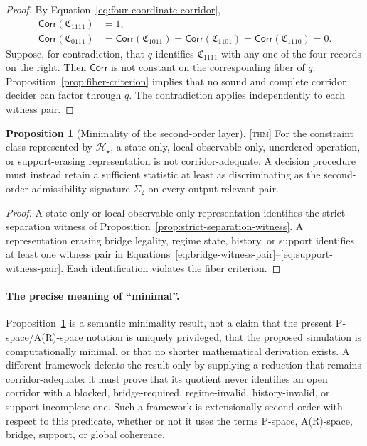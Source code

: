 \documentclass[11pt]{article}
\newcommand{\Thm}{\textsc{[thm]}}
\theoremstyle{definition}
\newtheorem{sproposition}{Proposition}
\begin{document}
\begin{proof}
By Equation~\eqref{eq:four-coordinate-corridor},
\begin{align}
\mathsf{Corr}(\mathfrak C_{1111})&=1,\\
\mathsf{Corr}(\mathfrak C_{0111})
&=\mathsf{Corr}(\mathfrak C_{1011})
=\mathsf{Corr}(\mathfrak C_{1101})
=\mathsf{Corr}(\mathfrak C_{1110})=0.
\end{align}
Suppose, for contradiction, that $q$ identifies $\mathfrak C_{1111}$ with any one
of the four records on the right. Then $\mathsf{Corr}$ is not constant on the
corresponding fiber of $q$. Proposition~\ref{prop:fiber-criterion} implies that no
sound and complete corridor decider can factor through $q$. The contradiction
applies independently to each witness pair.
\end{proof}

\begin{sproposition}[Minimality of the second-order layer]
\label{prop:second-order-minimality}
\Thm{} For the constraint class represented by $\mathcal H_\star$, a state-only,
local-observable-only, unordered-operation, or support-erasing representation is
not corridor-adequate. A decision procedure must instead retain a sufficient
statistic at least as discriminating as the second-order admissibility signature
$\Sigma_2$ on every output-relevant pair.
\end{sproposition}

\begin{proof}
A state-only or local-observable-only representation identifies the strict
separation witness of Proposition~\ref{prop:strict-separation-witness}. A
representation erasing bridge legality, regime state, history, or support
identifies at least one witness pair in
Equations~\eqref{eq:bridge-witness-pair}--\eqref{eq:support-witness-pair}. Each
identification violates the fiber criterion.
\end{proof}

\paragraph{The precise meaning of ``minimal''.}\label{rem:minimality-scope}
Proposition~\ref{prop:second-order-minimality} is a semantic minimality result,
not a claim that the present P-space/A(R)-space notation is uniquely privileged,
that the proposed simulation is computationally minimal, or that no shorter
mathematical derivation exists. A different framework defeats the result only by
supplying a reduction that remains corridor-adequate: it must prove that its
quotient never identifies an open corridor with a blocked, bridge-required,
regime-invalid, history-invalid, or support-incomplete one. Such a framework is
extensionally second-order with respect to this predicate, whether or not it uses
the terms P-space, A(R)-space, bridge, support, or global coherence.
\end{document}
